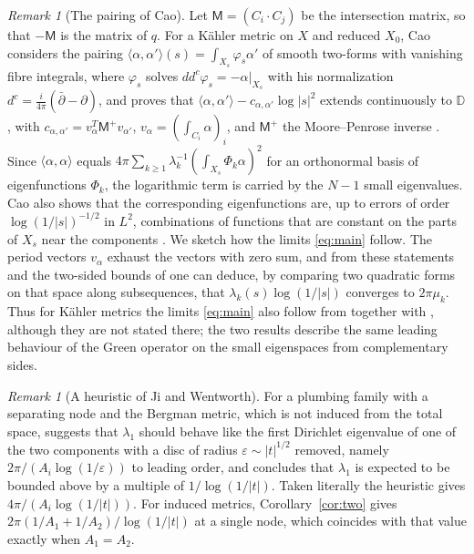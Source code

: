 \documentclass[11pt]{amsart}
\theoremstyle{definition}
\theoremstyle{remark}
\newtheorem{remark}[theorem]{Remark}
\begin{document}
\begin{remark}[The pairing of Cao]\label{rem:cao}
Let $\mathsf M=(C_i\cdot C_j)$ be the intersection matrix, so that
$-\mathsf M$ is the matrix of $q$. For a K\"ahler metric on $X$ and reduced $X_0$, Cao
considers the pairing
$\langle\alpha,\alpha'\rangle(s)=\int_{X_s}\varphi_s\alpha'$ of smooth
two-forms with vanishing fibre integrals, where $\varphi_s$ solves
$dd^c\varphi_s=-\alpha|_{X_s}$ with his normalization $d^c=\frac{i}{4\pi}(\bar\partial-\partial)$, and proves
that $\langle\alpha,\alpha'\rangle-c_{\alpha,\alpha'}\log|s|^2$ extends
continuously to $\mathbb D$, with $c_{\alpha,\alpha'}=v_\alpha^{T}\mathsf M^+v_{\alpha'}$,
$v_\alpha=(\int_{C_i}\alpha)_i$, and $\mathsf M^+$ the Moore--Penrose inverse
\cite[Theorem~0.2]{cao-pairing}. Since
$\langle\alpha,\alpha\rangle$ equals
$4\pi\sum_{k\ge1}\lambda_k^{-1}(\int_{X_s}\Phi_k\alpha)^2$ for an orthonormal
basis of eigenfunctions $\Phi_k$, the logarithmic term is carried by the
$N-1$ small eigenvalues. Cao also shows that the corresponding
eigenfunctions are, up to errors of order $\log(1/|s|)^{-1/2}$ in $L^2$,
combinations of functions that are constant on the parts of $X_s$ near the
components \cite[Theorem~2.10]{cao-pairing}. We sketch how the limits \eqref{eq:main} follow. The period vectors
$v_\alpha$ exhaust the vectors with zero sum, and from these statements
and the two-sided bounds of \cite{dai-yoshikawa} one can deduce, by
comparing two quadratic forms on that space along subsequences, that
$\lambda_k(s)\log(1/|s|)$ converges to $2\pi\mu_k$. Thus for K\"ahler
metrics the limits \eqref{eq:main} also follow from \cite{cao-pairing}
together with \cite{dai-yoshikawa}, although they are not stated there;
the two results describe the same leading behaviour of the Green operator
on the small eigenspaces from complementary sides.
\end{remark}

\begin{remark}[A heuristic of Ji and Wentworth]\label{rem:jw}
For a plumbing family with a separating node and the Bergman metric,
which is not induced from the total space, \cite[Remark~5.10]{ji-wentworth}
suggests that $\lambda_1$ should behave like the first Dirichlet
eigenvalue of one of the two components with a disc of radius
$\varepsilon\sim|t|^{1/2}$ removed, namely
$2\pi/(A_i\log(1/\varepsilon))$ to leading order, and concludes that
$\lambda_1$ is expected to be bounded above by a multiple of
$1/\log(1/|t|)$. Taken literally the heuristic gives
$4\pi/(A_i\log(1/|t|))$. For induced metrics, Corollary~\ref{cor:two}
gives $2\pi(1/A_1+1/A_2)/\log(1/|t|)$ at a single node, which coincides
with that value exactly when $A_1=A_2$.
\end{remark}
\end{document}
